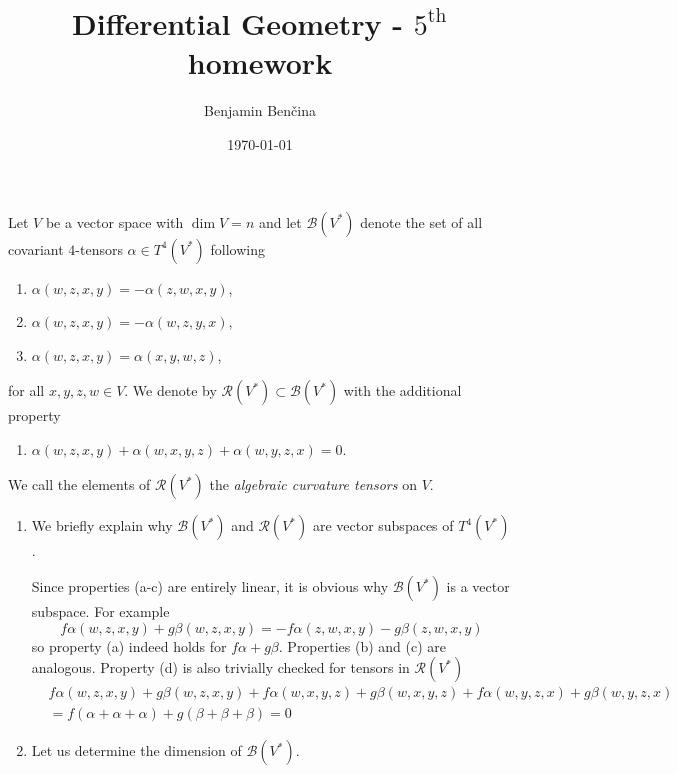 \documentclass[a4paper, 12pt]{article}
\title{Differential Geometry - $5^{\text{th}}$ homework}
\author{Benjamin Benčina}
\date{\today}
\begin{document}
\maketitle

\begin{Exercise}
    Let $V$ be a vector space with $\dim V = n$ and let $\mathcal{B}(V^*)$
    denote the set of all covariant $4$-tensors $\alpha \in T^4(V^*)$ following
    \begin{enumerate}[label=(\alph*)]
        \item $\alpha(w, z, x, y) = -\alpha(z, w, x, y)$,
        \item $\alpha(w, z, x, y) = -\alpha(w, z, y, x)$,
        \item $\alpha(w, z, x, y) = \alpha(x, y, w, z)$,
    \end{enumerate}
    for all $x, y, z, w \in V$.
    We denote by $\mathcal{R}(V^*) \subset \mathcal{B}(V^*)$ with the additional property
    \begin{enumerate}[resume,label=(\alph*)]
        \item $\alpha(w, z, x, y) + \alpha(w, x, y, z) + \alpha(w, y, z, x) = 0$.
    \end{enumerate}
    We call the elements of $\mathcal{R}(V^*)$ the \emph{algebraic curvature tensors} on $V$.
    \begin{enumerate}[label=(\roman*)]
        \item We briefly explain why $\mathcal{B}(V^*)$ and $\mathcal{R}(V^*)$ are vector subspaces of $T^4(V^*)$.

            Since properties (a-c) are entirely linear, it is obvious why $\mathcal{B}(V^*)$ is a vector subspace.
            For example
            \[
                f\alpha(w,z,x,y) + g\beta(w,z,x,y)
                = -f\alpha(z,w,x,y) - g\beta(z,w,x,y)
            \]
            so property (a) indeed holds for $f\alpha + g\beta$.
            Properties (b) and (c) are analogous.
            Property (d) is also trivially checked for tensors in $\mathcal{R}(V^*)$
            \begin{align*}
                &f\alpha(w,z,x,y) + g\beta(w,z,x,y) + f\alpha(w,x,y,z) + g\beta(w,x,y,z) + f\alpha(w,y,z,x) + g\beta(w,y,z,x) \\
                &= f(\alpha + \alpha + \alpha) + g(\beta + \beta + \beta) = 0
            \end{align*}
        \item Let us determine the dimension of $\mathcal{B}(V^*)$.


\end{enumerate}
\end{Exercise}
\end{document}
